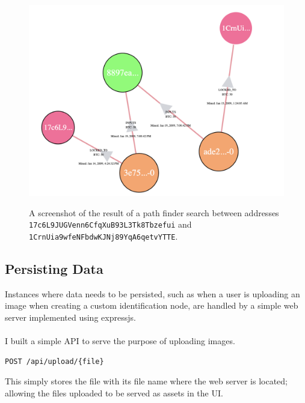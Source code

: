 \begin{figure}[h!]
  \centering
  \includegraphics[width = 12cm]{./figures/ui-screenshots/path-find-result}\\[0.5cm] 
  \caption{A screenshot of the result of a path finder search between addresses \texttt{17c6L9JUGVenn6CfqXuB93L3Tk8Tbzefui} and \texttt{1CrnUia9wfeNFbdwKJNj89YqA6qetvYTTE}.}
  \label{fig:path-search-result}
\end{figure}

\subsection{Persisting Data}\label{ui-persisting-data}
Instances where data needs to be persisted, such as when a user is uploading an image when creating a custom identification node, are handled by a simple web server implemented using expressjs. 
\\\\
I built a simple API to serve the purpose of uploading images.
\begin{lstlisting}
POST /api/upload/{file}
\end{lstlisting}
This simply stores the file with its file name where the web server is located; allowing the files uploaded to be served as assets in the UI. 